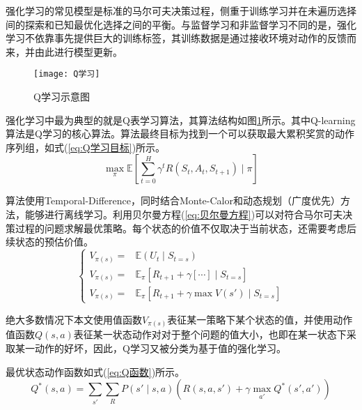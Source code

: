 强化学习的常见模型是标准的马尔可夫决策过程，侧重于训练学习并在未遍历选择间的探索和已知最优化选择之间的平衡。与监督学习和非监督学习不同的是，强化学习不依靠事先提供巨大的训练标签，其训练数据是通过接收环境对动作的反馈而来，并由此进行模型更新。

\begin{figure}[h]
	\centering
	\texttt{[image: Q学习]}
	\caption{Q学习示意图}
	\label{fig:Q学习}
\end{figure}

强化学习中最为典型的就是Q表学习算法，其算法结构如图\ref{fig:Q学习}所示。其中Q-learning算法是Q学习的核心算法。算法最终目标为找到一个可以获取最大累积奖赏的动作序列组，如式(\ref{eq:Q学习目标})所示。
\begin{equation}\label{eq:Q学习目标}
\underset{\pi}{\max }\mathbb{E}\left [ \sum_{t=0}^{H}\gamma^{t}R\left ( S_{t},A_{t},S_{t+1} \right )\mid\pi \right ]
\end{equation}

算法使用Temporal-Difference，同时结合Monte-Calor和动态规划（广度优先）方法，能够进行离线学习。利用贝尔曼方程(\ref{eq:贝尔曼方程})可以对符合马尔可夫决策过程的问题求解最优策略。每个状态的价值不仅取决于当前状态，还需要考虑后续状态的预估价值。
\begin{equation}\label{eq:贝尔曼方程}
\left\lbrace 
\begin{aligned}
V_{\pi(s)}=&\mathbb{E}\left ( U_{t}\mid S_{t=s} \right )\\
V_{\pi(s)}=&\mathbb{E}_{\pi}\left [ R_{t+1}+\gamma \left [ \cdots \right ]\mid S_{t=s} \right ]\\
V_{\pi(s)}=&\mathbb{E}_{\pi}\left [ R_{t+1}+\gamma \max V\left ( {s}' \right )\mid S_{t=s} \right ]
\end{aligned}
\right.
\end{equation}

绝大多数情况下本文使用值函数$V_{\pi(s)}$表征某一策略下某个状态的值，并使用动作值函数$Q(s,a)$表征某一状态动作对对于整个问题的值大小，也即在某一状态下采取某一动作的好坏，因此，Q学习又被分类为基于值的强化学习。

最优状态动作函数如式(\ref{eq:Q函数})所示。
\begin{equation}\label{eq:Q函数}
Q^{*}\left ( s,a \right )=\sum _{{s}'} \sum _{R}P\left ( {s}'\mid s,a \right )\left ( R\left ( s,a,{s}' \right ) +\gamma\max _{{a}'}Q^{*}\left ( {s}' ,{a}'\right )\right )
\end{equation}

